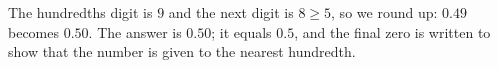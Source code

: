 The hundredths digit is $9$ and the next digit is $8\ge5$, so we round up: $0.49$ becomes $0.50$. The answer is $\boxed{0.50}$; it equals $0.5$, and the final zero is written to show that the number is given to the nearest hundredth.

